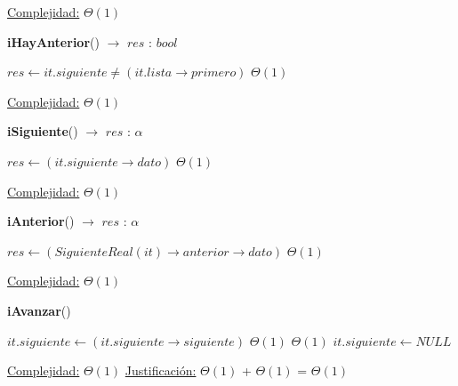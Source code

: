 \begin{Algoritmos}
\begin{algorithm}[H]
\begin{algorithmic}[1]
			\medskip
			\Statex \underline{Complejidad:} $\Theta(1)$
    	\end{algorithmic}
\end{algorithm}
	
\begin{algorithm}[H]	
	\begin{algorithmic}[1]
		\State \textbf{iHayAnterior}() $\to$ $res$ : $bool$
		
			\State $res \gets it.siguiente \neq (it.lista\rightarrow primero)$	\Comment $\Theta(1)$

			\medskip
			\Statex \underline{Complejidad:} $\Theta(1)$
    	\end{algorithmic}
\end{algorithm}
	
\begin{algorithm}[H]
	\begin{algorithmic}[1]
		\State \textbf{iSiguiente}() $\to$ $res$ : $\alpha$
		
			\State $res \gets (it.siguiente\rightarrow dato)$	\Comment $\Theta(1)$

			\medskip
			\Statex \underline{Complejidad:} $\Theta(1)$
    	\end{algorithmic}
\end{algorithm}
	
\begin{algorithm}[H]{\textbf{iAnterior}() $\to$ $res$ : $\alpha$}
	\begin{algorithmic}[1]	
			\State $res \gets (SiguienteReal(it)\rightarrow anterior\rightarrow dato)$	\Comment $\Theta(1)$

			\medskip
			\Statex \underline{Complejidad:} $\Theta(1)$
    	\end{algorithmic}
\end{algorithm}

\begin{algorithm}[H]
	\begin{algorithmic}[1]
		\State \textbf{iAvanzar}()
		
			\State $it.siguiente \gets (it.siguiente\rightarrow siguiente)$	\Comment $\Theta(1)$
				\Comment $\Theta(1)$
				\State $it.siguiente \gets NULL$	
			\EndIf

			\medskip
			\Statex \underline{Complejidad:} $\Theta(1)$
			\Statex \underline{Justificación:}  $\Theta(1)$ + $\Theta(1)$ = $\Theta(1)$
    	\end{algorithmic}
\end{algorithm}
	


\end{Algoritmos}
